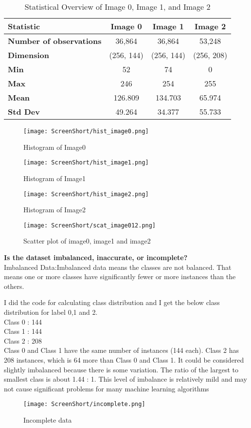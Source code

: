 \documentclass[conference,12pt]{IEEEtran}
\begin{document}
\begin{table}[h]
\centering
\caption{Statistical Overview of Image 0, Image 1, and Image 2}
\begin{tabular}{|p{2cm}|c|c|c|}
\hline
\textbf{Statistic} & \textbf{Image 0} & \textbf{Image 1} & \textbf{Image 2} \\
\hline
\textbf{Number of observations} & 36,864 & 36,864 & 53,248 \\
\textbf{Dimension} & (256, 144) & (256, 144) & (256, 208) \\
\textbf{Min} & 52 & 74 & 0 \\
\textbf{Max} & 246 & 254 & 255 \\
\textbf{Mean} & 126.809 & 134.703 & 65.974 \\
\textbf{Std Dev} & 49.264 & 34.377 & 55.733 \\
\hline
\end{tabular}
\label{tab:statistics}
\end{table}

\begin{figure}[h]
    \centering
    \texttt{[image: ScreenShort/hist\_image0.png]}
    \caption{Histogram of Image0}
\end{figure}
\begin{figure}[h]
    \centering
    \texttt{[image: ScreenShort/hist\_image1.png]}
    \caption{Histogram of Image1}
\end{figure}
\begin{figure}[h]
    \centering
    \texttt{[image: ScreenShort/hist\_image2.png]}
    \caption{Histogram of Image2}
\end{figure}
\begin{figure}[h]
    \centering
    \texttt{[image: ScreenShort/scat\_image012.png]}
    \caption{Scatter plot of image0, image1 and image2}
\end{figure}
\textbf{Is the dataset imbalanced, inaccurate, or incomplete?}\\

Imbalanced Data:Imbalanced data means the classes are not balanced. That means one or more classes have significantly fewer or more instances than the others.

I did the code for calculating class distribution and I get the below class distribution for label 0,1 and 2.\\
Class 0 : 144\\
Class 1 : 144\\
Class 2 : 208\\
Class 0 and Class 1 have the same number of instances (144 each). Class 2 has 208 instances, which is 64 more than Class 0 and Class 1. It could be considered slightly imbalanced because there is some variation. The ratio of the largest to smallest class is about 1.44 : 1. This level of imbalance is relatively mild and may not cause significant problems for many machine learning algorithms
\begin{figure}[h]
    \centering
    \texttt{[image: ScreenShort/incomplete.png]}
    \caption{Incomplete data}
\end{figure}
\end{document}
